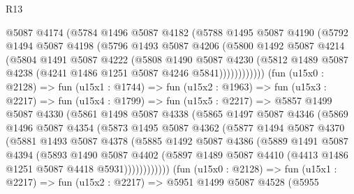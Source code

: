 \begin{lexlean}{R13}
\begin{coremodule}
              @5087
              @4174
              (@5784
                @1496
                @5087
                @4182
                (@5788
                  @1495
                  @5087
                  @4190
                  (@5792
                    @1494
                    @5087
                    @4198
                    (@5796
                      @1493
                      @5087
                      @4206
                      (@5800
                        @1492
                        @5087
                        @4214
                        (@5804
                          @1491
                          @5087
                          @4222
                          (@5808
                            @1490
                            @5087
                            @4230
                            (@5812
                              @1489
                              @5087
                              @4238
                              (@4241 @1486 @1251 @5087 @4246 @5841))))))))))))
        (fun (u15x0 : @2128) =>
        fun (u15x1 : @1744) =>
        fun (u15x2 : @1963) =>
        fun (u15x3 : @2217) =>
        fun (u15x4 : @1799) =>
        fun (u15x5 : @2217) =>
        @5857
          @1499
          @5087
          @4330
          (@5861
            @1498
            @5087
            @4338
            (@5865
              @1497
              @5087
              @4346
              (@5869
                @1496
                @5087
                @4354
                (@5873
                  @1495
                  @5087
                  @4362
                  (@5877
                    @1494
                    @5087
                    @4370
                    (@5881
                      @1493
                      @5087
                      @4378
                      (@5885
                        @1492
                        @5087
                        @4386
                        (@5889
                          @1491
                          @5087
                          @4394
                          (@5893
                            @1490
                            @5087
                            @4402
                            (@5897
                              @1489
                              @5087
                              @4410
                              (@4413 @1486 @1251 @5087 @4418 @5931))))))))))))
        (fun (u15x0 : @2128) =>
        fun (u15x1 : @2217) =>
        fun (u15x2 : @2217) =>
        @5951
          @1499
          @5087
          @4528
          (@5955

\end{coremodule}
\end{lexlean}
